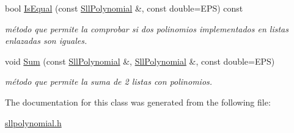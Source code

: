 \begin{DoxyCompactItemize}
bool \hyperlink{classSllPolynomial_a173ebaed12d4851de81030ad04f6af4a}{Is\+Equal} (const \hyperlink{classSllPolynomial}{Sll\+Polynomial} \&, const double=E\+PS) const
\begin{DoxyCompactList}\small\item\em método que permite la comprobar si dos polinomios implementados en listas enlazadas son iguales. \end{DoxyCompactList}\item 
\mbox{\label{classSllPolynomial_a005626be0181e7531d737c780a6d6ffa}} 
void \hyperlink{classSllPolynomial_a005626be0181e7531d737c780a6d6ffa}{Sum} (const \hyperlink{classSllPolynomial}{Sll\+Polynomial} \&, \hyperlink{classSllPolynomial}{Sll\+Polynomial} \&, const double=E\+PS)
\begin{DoxyCompactList}\small\item\em método que permite la suma de 2 listas con polinomios. \end{DoxyCompactList}\end{DoxyCompactItemize}


The documentation for this class was generated from the following file\+:\begin{DoxyCompactItemize}
\item 
\hyperlink{sllpolynomial_8h}{sllpolynomial.\+h}\end{DoxyCompactItemize}
